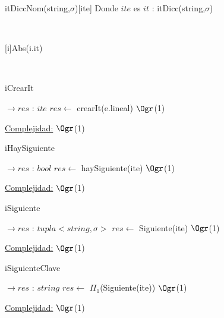 \begin{Representacion}


	\begin{Estructura}{itDiccNom(string,$\sigma$)}[ite]
		Donde $ite$ es $it$ :  itDicc(string,$\sigma$)
	\end{Estructura}
		

~
	
	{Abs(i.it)}
	
~

	\begin{algorithm}
		\caption{iCrearIt}
		\begin{algorithmic}
			 $\to res$ : $ite$
				\State $res \gets$ crearIt(e.lineal) \Comment $\Ogr$(1)
			\EndProcedure
		\end{algorithmic}
		\underline{Complejidad:} $\Ogr$(1)
	\end{algorithm}
	
	\begin{algorithm}
		\caption{iHaySiguiente}
		\begin{algorithmic}
			 $\to res$ : $bool$
				\State $res \gets$ haySiguiente(ite) \Comment $\Ogr$(1)
			\EndProcedure
		\end{algorithmic}
		\underline{Complejidad:} $\Ogr$(1)
	\end{algorithm}
	
	\begin{algorithm}
		\caption{iSiguiente}
		\begin{algorithmic}
			 $\to res$ : $tupla<string,\sigma>$
				\State $res \gets$ Siguiente(ite) \Comment $\Ogr$(1)
			\EndProcedure
		\end{algorithmic}
		\underline{Complejidad:} $\Ogr$(1)
	\end{algorithm}
	
	\begin{algorithm}
		\caption{iSiguienteClave}
		\begin{algorithmic}
			 $\to res$ : $string$
				\State $res \gets$ $\Pi_1$(Siguiente(ite)) \Comment $\Ogr$(1)
			\EndProcedure
		\end{algorithmic}
		\underline{Complejidad:} $\Ogr$(1)
	\end{algorithm}
	

\end{Representacion}
